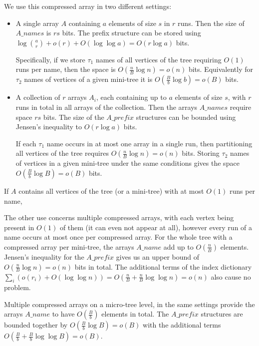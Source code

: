 We use this compressed array in two different settings:
\begin{itemize}
	\item A single array $A$ containing $a$ elements of size $s$ in $r$ runs.
	Then the size of $A\_names$ is $r s$ bits.
	The prefix structure can be stored using $\log {a \choose r} + o(r) + O(\log \log a) = O(r \log a)$ bits.
	
	Specifically, if we store $\tau_1$ names of all vertices of the tree requiring $O(1)$ runs per name, then the space is $O(\frac{n}{B} \log n) = o(n)$ bits.
	Equivalently for $\tau_2$ names of vertices of a given mini-tree it is $O(\frac{B}{b} \log b) = o(B)$ bits.
	\item A collection of $r$ arrays $A_i$, each containing up to $a$ elements of size $s$, with $r$ runs in total in all arrays of the collection.
	Then the arrays $A\_names$ require space $r s$ bits.
	The size of the $A\_prefix$ structures can be bounded using Jensen's inequality to $O(r \log a)$ bits.
	
	If each $\tau_1$ name occurs in at most one array in a single run, then partitioning all vertices of the tree requires $O(\frac{n}{B} \log n) = o(n)$ bits.
	Storing $\tau_2$ names of vertices in a given mini-tree under the same conditions gives the space $O(\frac{B}{b} \log B) = o(B)$ bits.
\end{itemize}
If $A$ contains all vertices of the tree (or a mini-tree) with at most $O(1)$ runs per name, 

The other use concerns multiple compressed arrays, with each vertex being present in $O(1)$ of them (it can even not appear at all), however every run of a name occurs at most once per compressed array.
For the whole tree with a compressed array per mini-tree, the arrays $A\_name$ add up to $O(\frac{n}{B})$ elements.
Jensen's inequality for the $A\_prefix$ gives us an upper bound of $O(\frac{n}{B} \log n) = o(n)$ bits in total.
The additional terms of the index dictionary $\sum_i (o(r_i) + O(\log \log n)) = O(\frac{n}{B} + \frac{n}{B} \log \log n) = o(n)$ also cause no problem.

Multiple compressed arrays on a micro-tree level, in the same settings provide the arrays $A\_name$ to have $O(\frac{B}{b})$ elements in total.
The $A\_prefix$ structures are bounded together by $O(\frac{B}{b} \log B) = o(B)$ with the additional terms $O(\frac{B}{b} + \frac{B}{b} \log \log B) = o(B)$.

